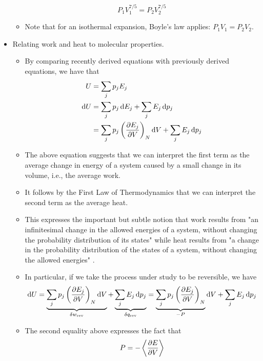 \documentclass[../notes.tex]{subfiles}
\begin{document}
\begin{itemize}
\begin{itemize}
        \begin{equation*}
            P_1V_1^{7/5} = P_2V_2^{7/5}
        \end{equation*}
        \item Note that for an isothermal expansion, Boyle's law applies: $P_1V_1=P_2V_2$.
    \end{itemize}
    \item Relating work and heat to molecular properties.
    \begin{itemize}
        \item By comparing recently derived equations with previously derived equations, we have that
        \begin{align*}
            U &= \sum_jp_jE_j\\
            \dd{U} &= \sum_jp_j\dd{E_j}+\sum_jE_j\dd{p_j}\\
            &= \sum_jp_j\left( \pdv{E_j}{V} \right)_N\dd{V}+\sum_jE_j\dd{p_j}
        \end{align*}
        \item The above equation suggests that we can interpret the first term as the average change in energy of a system caused by a small change in its volume, i.e., the average work.
        \item It follows by the First Law of Thermodynamics that we can interpret the second term as the average heat.
        \item This expresses the important but subtle notion that work results from "an infinitesimal change in the allowed energies of a system, without changing the probability distribution of its states" while heat results from "a change in the probability distribution of the states of a system, without changing the allowed energies" \parencite[780]{bib:McQuarrieSimon}.
        \item In particular, if we take the process under study to be reversible, we have
        \begin{equation*}
            \dd{U} = \underbrace{\sum_jp_j\left( \pdv{E_j}{V} \right)_N\dd{V}}_{\var{w_\text{rev}}}+\underbrace{\sum_jE_j\dd{p_j}}_{\var{q_\text{rev}}}
            = \underbrace{\sum_jp_j\left( \pdv{E_j}{V} \right)_N}_{-P}\dd{V}+\sum_jE_j\dd{p_j}
        \end{equation*}
        \item The second equality above expresses the fact that
        \begin{equation*}
            P = -\left\langle{\pdv{E}{V}}\right\rangle
        \end{equation*}

\end{itemize}
\end{itemize}
\end{document}
